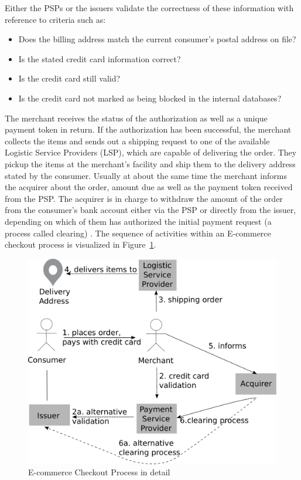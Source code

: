 Either the \gls{PSP}s or the issuers validate the correctness of these information with reference to criteria such as: \@

\begin{itemize}
    \item Does the billing address match the current consumer's postal address on file?
    \item Is the stated credit card information correct?
    \item Is the credit card still valid?
    \item Is the credit card not marked as being blocked in the internal databases?
\end{itemize}

The merchant receives the status of the authorization as well as a unique payment token in return. If the authorization has been successful, the merchant collects the items and sends out a shipping request to one of the available Logistic Service Providers (\gls{LSP}), which are capable of delivering the order. They pickup the items at the merchant's facility and ship them to the delivery address stated by the consumer. Usually at about the same time the merchant informs the acquirer about the order, amount due as well as the payment token received from the \gls{PSP}. The acquirer is in charge to withdraw the amount of the order from the consumer's bank account either via the \gls{PSP} or directly from the issuer, depending on which of them has authorized the initial payment request (a process called clearing) \citep{VisaPayment2014}. The sequence of activities within an \gls{E-commerce} checkout process is visualized in Figure~\ref{fig:images_ecommerce_checkout_process}.\@

\begin{figure}[!ht]
	\centering
		\includegraphics[width=0.9\columnwidth]{images/e-commerce-checkout-process.pdf}
	\caption{\gls{E-commerce} Checkout Process in detail}
\label{fig:images_ecommerce_checkout_process}
\end{figure}

